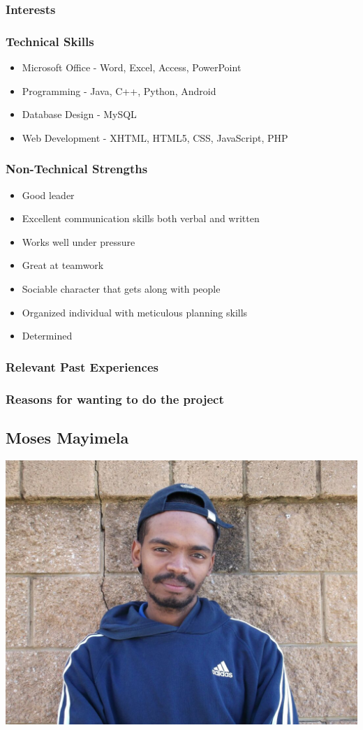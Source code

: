 \documentclass[a4paper,12pt]{article}
\begin{document}
\subsubsection{Interests}
\subsubsection{Technical Skills}
\begin{itemize}
\item Microsoft Office - Word, Excel, Access, PowerPoint
\item Programming - Java, C++, Python, Android
\item Database Design - MySQL
\item Web Development - XHTML, HTML5, CSS, JavaScript, PHP
\end{itemize}
\subsubsection{Non-Technical Strengths}
\begin{itemize}
\item Good leader
\item Excellent communication skills both verbal and written
\item Works well under pressure
\item Great at teamwork
\item Sociable character that gets along with people
\item Organized individual with meticulous planning skills
\item Determined
\end{itemize}
\subsubsection{Relevant Past Experiences}
\subsubsection{Reasons for wanting to do the project}
\newpage
\subsection{Moses Mayimela}
\includegraphics[width=\textwidth]{images/moses.jpg}
\end{document}
